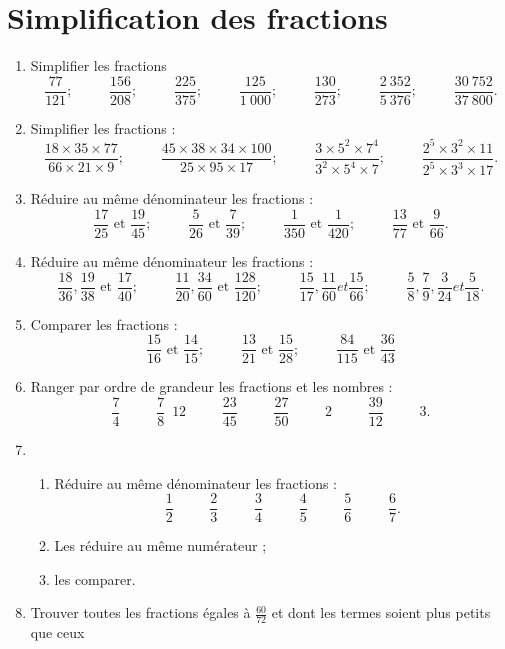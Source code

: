 
\chapter*{Simplification des fractions}

\begin{enumerate}
\item Simplifier les fractions 
\[ \frac{77}{121}; \phantom{meow}
\frac{156}{208};\phantom{meow}
\frac{225}{375};\phantom{meow}
\frac{125}{1~000};\phantom{meow}
\frac{130}{273}; \phantom{meow}
\frac{2~352}{5~376}; \phantom{meow}
\frac{30~752}{37~800}.\]
\item Simplifier les fractions : 
\[\frac{18\times 35\times77}{66\times 21\times9}; 
\phantom{meow} \frac{45\times 38\times 34\times 100}{25\times 95\times 17};\phantom{meow}\frac{3\times 5^2\times7^4}{3^2\times5^4\times 7};\phantom{meow}\frac{2^5\times3^2\times11}{2^5\times3^3\times17}.\]
\item Réduire au même dénominateur les fractions : 
\[ \frac{17}{25}\text{  et  }\frac{19}{45};\phantom{meow}
\frac{5}{26}\text{  et  }\frac{7}{39};\phantom{meow}
\frac1{350}\text{  et  }\frac1{420};\phantom{meow}
\frac{13}{77}\text{  et  }\frac{9}{66}.\]
\item Réduire au même dénominateur les fractions : 
\[\frac{18}{36}, \frac{19}{38}\text{  et  }\frac{17}{40}; \phantom{meow} 
\frac{11}{20}, \frac{34}{60} \text{  et  }\frac{128}{120}; \phantom{meow}
\frac{15}{17}, \frac{11}{60} et \frac{15}{66}; \phantom{meow}
\frac58, \frac79, \frac3{24} et \frac5{18}.\]
\item Comparer les fractions : \[\frac{15}{16}\text{  et  }\frac{14}{15}; \phantom{meow}\frac{13}{21}\text{  et  }\frac{15}{28}; \phantom{meow}\frac{84}{115}\text{  et  }\frac{36}{43}\]
\item Ranger par ordre de grandeur les fractions et les nombres : \[\frac74 \phantom{meow}\frac78\phantom{5}{12}\phantom{meow}\frac{23}{45}
\phantom{meow}\frac{27}{50}\phantom{meow}2\phantom{meow}\frac{39}{12}\phantom{meow}3.\]
\item \begin{enumerate}
\item Réduire au même dénominateur les fractions : 
\[\frac12\phantom{meow}\frac23\phantom{meow}\frac34
\phantom{meow}\frac45\phantom{meow}\frac56\phantom{meow}\frac67.\]
\item Les réduire au même numérateur ; 
\item les comparer. 
\end{enumerate}
\item Trouver toutes les fractions égales à $\frac{60}{72}$ et dont les termes soient plus petits que ceux

\end{enumerate}
